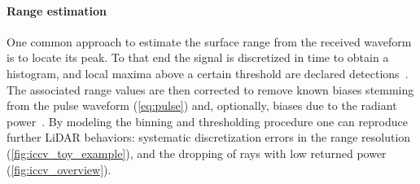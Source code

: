 \paragraph{Range estimation}
One common approach to estimate the surface range from the received waveform is to locate its peak. To that end the signal is discretized in time to obtain a histogram, and local maxima above a certain threshold are declared detections~\cite{winiwarter2022virtual}. The associated range values are then corrected to remove known biases stemming from the pulse waveform (\cf \cref{eq:pulse}) and, optionally, biases due to the radiant power~\cite{winiwarter2022virtual}.
By modeling the binning and thresholding procedure one can reproduce further LiDAR  behaviors: systematic discretization errors in the range resolution (\cf \cref{fig:iccv_toy_example}), and the dropping of rays with low returned power (\cf \cref{fig:iccv_overview}).


